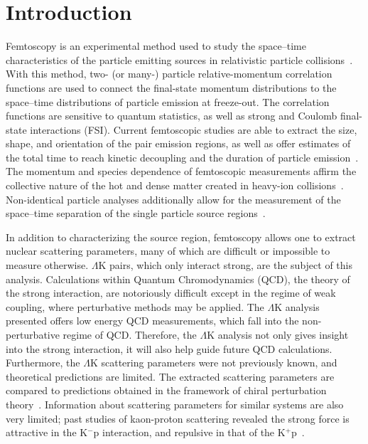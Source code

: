 \documentclass[ALICE,manyauthors]{cernphprep}
\newcommand{\LamK}{$\Lambda$K\xspace}
\begin{document}
\section{Introduction}
\label{sec:Introduction}

Femtoscopy is an experimental method used to study the space--time characteristics of the particle emitting sources in relativistic particle collisions~\cite{Lisa:2005dd, Kopylov:1972qw}.  
With this method, two- (or many-) particle relative-momentum correlation functions are used to connect the final-state momentum distributions to the space--time distributions of particle emission at freeze-out.  
The correlation functions are sensitive to quantum statistics, as well as strong and Coulomb final-state interactions (FSI).  
Current femtoscopic studies are able to extract the size, shape, and orientation of the pair emission regions, as well as offer estimates of the total time to reach kinetic decoupling and the duration of particle emission~\cite{Lisa:2005dd, Lisa:2008gf}.
The momentum and species dependence of femtoscopic measurements affirm the collective nature of the hot and dense matter created in heavy-ion collisions~\cite{Makhlin:1987gm, Akkelin:1995gh, Retiere:2003kf, Kisiel:2009eh}.
Non-identical particle analyses additionally allow for the measurement of the space--time separation of the single particle source regions~\cite{Lednicky:1995vk, Voloshin:1997jh, Lednicky:2001qv, Retiere:2003kf}.

In addition to characterizing the source region, femtoscopy allows one to extract nuclear scattering parameters, many of which are difficult or impossible to measure otherwise.  
\LamK pairs, which only interact strong, are the subject of this analysis.
Calculations within Quantum Chromodynamics (QCD), the theory of the strong interaction, are notoriously difficult except in the regime of weak coupling, where perturbative methods may be applied. 
The \LamK analysis presented offers low energy QCD measurements, which fall into the non-perturbative regime of QCD.
Therefore, the \LamK analysis not only gives insight into the strong interaction, it will also help guide future QCD calculations.
Furthermore, the \LamK scattering parameters were not previously known, and theoretical predictions are limited.
The extracted scattering parameters are compared to predictions obtained in the framework of chiral perturbation theory~\cite{Liu:2006xja,Mai:2009ce}.
Information about scattering parameters for similar systems are also very limited; past studies of kaon-proton scattering revealed the strong force is attractive in the K$^{-}$p interaction, and repulsive in that of the K$^{+}$p~\cite{Humphrey:1962zz, Hadjimichef:2002xe, Ikeda:2012au}.
\end{document}
